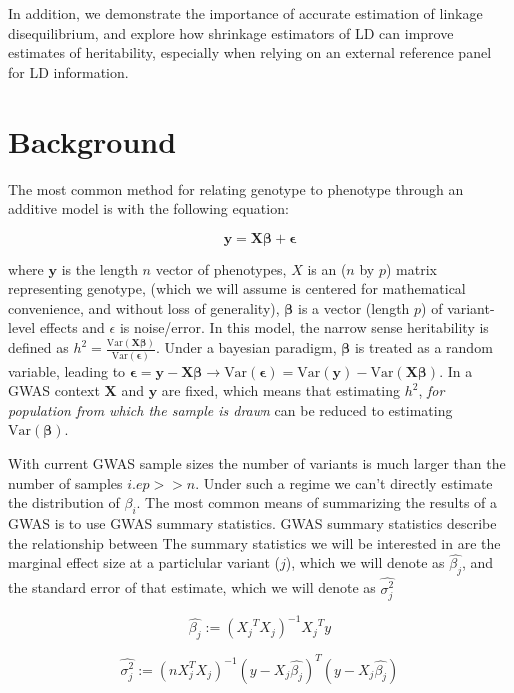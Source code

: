 In addition, we demonstrate the importance of accurate estimation of linkage disequilibrium, and explore how shrinkage estimators of LD can improve estimates of heritability, especially when relying on an external reference panel for LD information.

\section{Background}

The most common method for relating genotype to phenotype through  an additive model is with the following equation:

$$ \textbf{y}= \textbf{X} \boldsymbol{\beta} + \boldsymbol{\epsilon}$$

where $\textbf{y}$ is the length $n$ vector of phenotypes, \(X\) is an (\(n\) by \(p\)) matrix representing genotype, (which we will assume is centered for mathematical convenience, and without loss of generality), \(\boldsymbol{\beta}\) is a vector (length \(p\)) of variant-level effects and \(\epsilon\) is noise/error. In this model, the narrow sense heritability is defined as $h^2=\frac{\text{Var}(\textbf{X}\boldsymbol{\beta})}{\text{Var}(\boldsymbol{\epsilon})}$. Under a bayesian paradigm, $\boldsymbol{\beta}$ is treated as a random variable, leading to  $\boldsymbol{\epsilon} = \textbf{y}-\textbf{X}\boldsymbol{\beta} \rightarrow \text{Var}(\boldsymbol{\epsilon})= \text{Var}(\textbf{y})-\text{Var}(\textbf{X}\boldsymbol{\beta})$.  In a GWAS context $\textbf{X}$ and $\textbf{y}$ are fixed, which means that estimating $h^2$, \emph{for population from which the sample is drawn} can be reduced to estimating $\text{Var}(\boldsymbol{\beta})$.

With current GWAS sample sizes the number of variants is much larger than the number of samples \(i.e p >>n\).  Under such a regime we can't directly estimate the distribution of \(\beta_i\). The most common means of summarizing the results of a GWAS is to use GWAS summary statistics.  GWAS summary statistics describe the relationship between 
The summary statistics we will be interested in are the marginal effect size at a particlular variant (\(j\)), which we will denote as
\(\hat{\beta_j}\), and the standard error of that estimate, which we will denote as \(\hat{\sigma_j^2}\)

$$ \hat{\beta_j} := {({X_j}^{T}X_j)}^{-1}{X_j}^{T}y $$

$$ \hat{\sigma_j^2} := (nX_j^TX_j)^{-1}(y-X_j\hat{\beta_j})^T(y-X_j\hat{\beta_j}) $$

